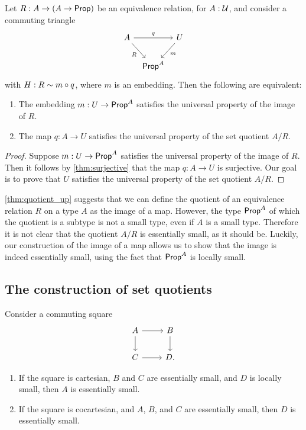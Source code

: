 \begin{thm}\label{thm:quotient_up}
Let $R:A\to (A\to \mathsf{Prop})$ be an equivalence relation, for $A:\mathcal{U}$, and consider a commuting triangle
\begin{equation*}
\begin{tikzcd}[column sep=tiny]
A \arrow[rr,"q"] \arrow[dr,swap,"R"] & & U \arrow[dl,"m"] \\
& \prop^A
\end{tikzcd}
\end{equation*}
with $H:R\sim m\circ q$, where $m$ is an embedding. Then the following are equivalent:
\begin{enumerate}
\item The embedding $m:U\to \mathsf{Prop}^A$ satisfies the universal property of the image of $R$.
\item The map $q:A\to U$ satisfies the universal property of the set quotient $A/R$.
\end{enumerate}
\end{thm}

\begin{proof}
Suppose $m:U\to \mathsf{Prop}^A$ satisfies the universal property of the image of $R$. Then it follows by \cref{thm:surjective} that the map $q:A\to U$ is surjective. Our goal is to prove that $U$ satisfies the universal property of the set quotient $A/R$. 
\end{proof}

\begin{rmk}
\cref{thm:quotient_up} suggests that we can define the quotient of an equivalence relation $R$ on a type $A$ as the image of a map. However, the type $\mathsf{Prop}^A$ of which the quotient is a subtype is not a small type, even if $A$ is a small type.
Therefore it is not clear that the quotient $A/R$ is essentially small, as it should be. Luckily, our construction of the image of a map allows us to show that the image is indeed essentially small, using the fact that $\mathsf{Prop}^A$ is locally small.
\end{rmk}

\subsection{The construction of set quotients}
\begin{lem}
Consider a commuting square
\begin{equation*}
\begin{tikzcd}
A \arrow[r] \arrow[d] & B \arrow[d] \\
C \arrow[r] & D.
\end{tikzcd}
\end{equation*}
\begin{enumerate}
\item If the square is cartesian, $B$ and $C$ are essentially small, and $D$ is locally small, then $A$ is essentially small.
\item If the square is cocartesian, and $A$, $B$, and $C$ are essentially small, then $D$ is essentially small. 
\end{enumerate}
\end{lem}

